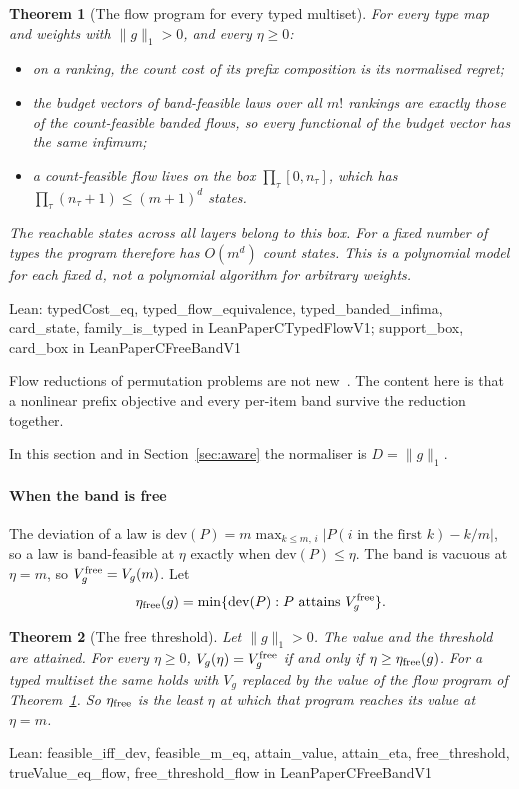 \documentclass[conference]{IEEEtran}
\newtheorem{theorem}{Theorem}
\theoremstyle{definition}
\newcommand{\lean}[1]{\textsf{\footnotesize #1}}
\newcommand{\leanbox}[1]{%
  \par\vspace{2pt}\noindent
  {\raggedright\footnotesize\textsf{Lean: #1}\par}\vspace{2pt}}
\begin{document}
\begin{theorem}[The flow program for every typed multiset]
\label{thm:typedflow}
For every type map and weights with $\|g\|_1>0$, and every $\eta\ge0$:
\begin{itemize}
\item on a ranking, the count cost of its prefix composition is its normalised regret;
\item the budget vectors of band-feasible laws over all $m!$ rankings are exactly those of the
count-feasible banded flows, so every functional of the budget vector has the same infimum;
\item a count-feasible flow lives on the box $\prod_\tau[0,n_\tau]$, which has
$\prod_\tau(n_\tau+1)\le(m+1)^d$ states.
\end{itemize}
The reachable states across all layers belong to this box. For a fixed number of types
the program therefore has $O(m^d)$ count states. This is a
polynomial model for each fixed $d$, not a polynomial algorithm for arbitrary weights.
\end{theorem}
\leanbox{\lean{typedCost\_eq}, \lean{typed\_flow\_equivalence}, \lean{typed\_banded\_infima},
\lean{card\_state}, \lean{family\_is\_typed} in \lean{LeanPaperCTypedFlowV1};
\lean{support\_box}, \lean{card\_box} in \lean{LeanPaperCFreeBandV1}}

Flow reductions of permutation problems are not new~\cite{schrijver2003}. The content here is
that a nonlinear prefix objective and every per-item band survive the reduction together.

In this section and in Section~\ref{sec:aware} the normaliser is $D=\|g\|_1$.

\paragraph{When the band is free} The deviation of a law is
$\mathrm{dev}(P)=m\max_{k\le m,\,i}|P(i\text{ in the first }k)-k/m|$, so a law is band-feasible
at $\eta$ exactly when $\mathrm{dev}(P)\le\eta$. The band is vacuous at $\eta=m$, so
$V^{\rm free}_g=V_g(m)$. Let
\[
\eta_{\rm free}(g)=\min\{\mathrm{dev}(P):P\ \text{attains}\ V^{\rm free}_g\}.
\]

\begin{theorem}[The free threshold]
\label{thm:freeband}
Let $\|g\|_1>0$. The value and the threshold are attained. For every $\eta\ge0$,
$V_g(\eta)=V^{\rm free}_g$ if and only if $\eta\ge\eta_{\rm free}(g)$. For a typed multiset
the same holds with $V_g$ replaced by the value of the flow program of
Theorem~\ref{thm:typedflow}. So $\eta_{\rm free}$ is the least $\eta$ at which that program
reaches its value at $\eta=m$.
\end{theorem}
\leanbox{\lean{feasible\_iff\_dev}, \lean{feasible\_m\_eq}, \lean{attain\_value},
\lean{attain\_eta}, \lean{free\_threshold}, \lean{trueValue\_eq\_flow}, \lean{free\_threshold\_flow}
in \lean{LeanPaperCFreeBandV1}}
\end{document}
